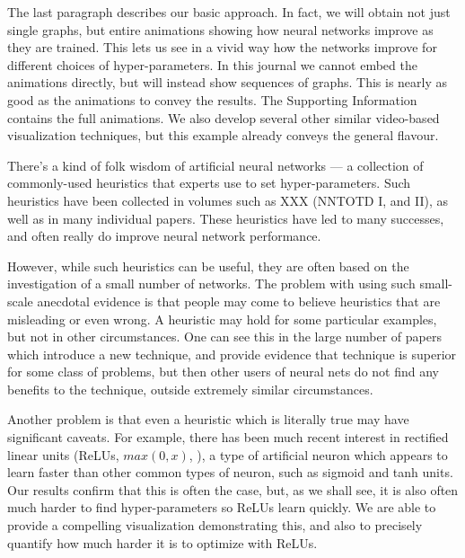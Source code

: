 \documentclass[10pt]{article}
\begin{document}
%
%
The last paragraph describes our basic approach.  In fact, we will
obtain not just single graphs, but entire animations showing how
neural networks improve as they are trained.  This lets us see in a
vivid way how the networks improve for different choices of
hyper-parameters.  In this journal we cannot embed the animations
directly, but will instead show sequences of graphs.  This is nearly
as good as the animations to convey the results.  The Supporting
Information contains the full animations.  We also develop several
other similar video-based visualization techniques, but this example
already conveys the general flavour.

%
%
There's a kind of folk wisdom of artificial neural networks --- a
collection of commonly-used heuristics that experts use to set
hyper-parameters.  Such heuristics have been collected in volumes such
as XXX (NNTOTD I, and II), as well as in many individual papers.
These heuristics have led to many successes, and often really do
improve neural network performance.

%
%
However, while such heuristics can be useful, they are often based on
the investigation of a small number of networks.  The problem with
using such small-scale anecdotal evidence is that people may come to
believe heuristics that are misleading or even wrong.  A heuristic may
hold for some particular examples, but not in other circumstances.
One can see this in the large number of papers which introduce a new
technique, and provide evidence that technique is superior for some
class of problems, but then other users of neural nets do not find any
benefits to the technique, outside extremely similar circumstances.

%
%
Another problem is that even a heuristic which is literally true may
have significant caveats.  For example, there has been much recent
interest in rectified linear units (ReLUs, $max(0,x)$,
\cite{Glorot2010a,Nair2010a,Jarrett2009a}), a type of artificial
neuron which appears to learn faster than other common types of
neuron, such as sigmoid and tanh units. \cite{Krizhevsky2012a} Our
results confirm that this is often the case, but, as we shall see, it
is also often much harder to find hyper-parameters so ReLUs learn
quickly.  We are able to provide a compelling visualization
demonstrating this, and also to precisely quantify how much harder it
is to optimize with ReLUs.
\end{document}

